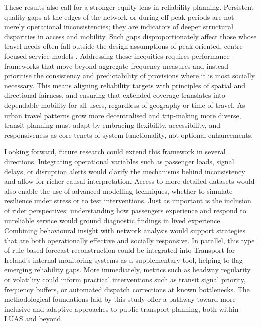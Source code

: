     These results also call for a stronger equity lens in reliability planning. Persistent quality gaps at the edges of the network or during off-peak periods are not merely operational inconsistencies; they are indicators of deeper structural disparities in access and mobility. Such gaps disproportionately affect those whose travel needs often fall outside the design assumptions of peak-oriented, centre-focused service models \parencites{caulfield2021trinity}{hynes2020utility}. Addressing these inequities requires performance frameworks that move beyond aggregate frequency measures and instead prioritise the consistency and predictability of provisions where it is most socially necessary. This means aligning reliability targets with principles of spatial and directional fairness, and ensuring that extended coverage translates into dependable mobility for all users, regardless of geography or time of travel. As urban travel patterns grow more decentralised and trip-making more diverse, transit planning must adapt by embracing flexibility, accessibility, and responsiveness as core tenets of system functionality, not optional enhancements.

    Looking forward, future research could extend this framework in several directions. Integrating operational variables such as passenger loads, signal delays, or disruption alerts would clarify the mechanisms behind inconsistency and allow for richer causal interpretation. Access to more detailed datasets would also enable the use of advanced modelling techniques, whether to simulate resilience under stress or to test interventions. Just as important is the inclusion of rider perspectives: understanding how passengers experience and respond to unreliable service would ground diagnostic findings in lived experience. Combining behavioural insight with network analysis would support strategies that are both operationally effective and socially responsive. In parallel, this type of rule-based forecast reconstruction could be integrated into Transport for Ireland’s internal monitoring systems as a supplementary tool, helping to flag emerging reliability gaps. More immediately, metrics such as headway regularity or volatility could inform practical interventions such as transit signal priority, frequency buffers, or automated dispatch corrections at known bottlenecks. The methodological foundations laid by this study offer a pathway toward more inclusive and adaptive approaches to public transport planning, both within LUAS and beyond.
